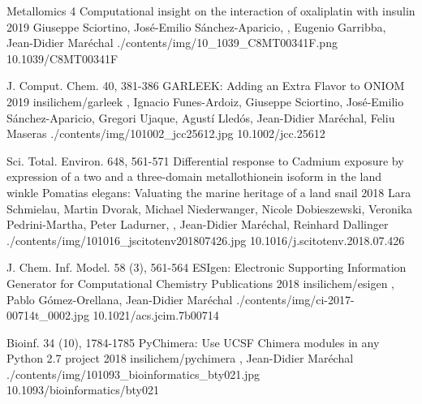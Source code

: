 \begin{cventries}
  \pubentry
    {Metallomics 4} %
    {Computational insight on the interaction of oxaliplatin with insulin} %
    {2019} %
    {} %
    {Giuseppe Sciortino, José-Emilio Sánchez-Aparicio, , Eugenio Garribba, Jean-Didier Maréchal} %
    {./contents/img/10_1039_C8MT00341F.png} %
    {10.1039/C8MT00341F} %

  \pubentry
    {J. Comput. Chem. 40, 381-386} %
    {GARLEEK: Adding an Extra Flavor to ONIOM} %
    {2019} %
    {insilichem/garleek} %
    {, Ignacio Funes-Ardoiz, Giuseppe Sciortino, José-Emilio Sánchez-Aparicio, Gregori Ujaque, Agustí Lledós, Jean-Didier Maréchal, Feliu Maseras} %
    {./contents/img/101002_jcc25612.jpg} %
    {10.1002/jcc.25612} %

  \pubentry
    {Sci. Total. Environ. 648, 561-571} %
    {Differential response to Cadmium exposure by expression of a two and a three-domain metallothionein isoform in the land winkle Pomatias elegans: Valuating the marine heritage of a land snail} %
    {2018} %
    {} %
    {Lara Schmielau, Martin Dvorak, Michael Niederwanger, Nicole Dobieszewski, Veronika Pedrini-Martha, Peter Ladurner, , Jean-Didier Maréchal, Reinhard Dallinger} %
    {./contents/img/101016_jscitotenv201807426.jpg} %
    {10.1016/j.scitotenv.2018.07.426} %

  \pubentry
    {J. Chem. Inf. Model. 58 (3), 561-564} %
    {ESIgen: Electronic Supporting Information Generator for Computational Chemistry Publications} %
    {2018} %
    {insilichem/esigen} %
    {,\textsuperscript{\dagger} Pablo Gómez-Orellana, Jean-Didier Maréchal\textsuperscript{\dagger}} %
    {./contents/img/ci-2017-00714t_0002.jpg} %
    {10.1021/acs.jcim.7b00714} %

  \pubentry
    {Bioinf. 34 (10), 1784-1785} %
    {PyChimera: Use UCSF Chimera modules in any Python 2.7 project} %
    {2018} %
    {insilichem/pychimera} %
    {,\textsuperscript{\dagger} Jean-Didier Maréchal\textsuperscript{\dagger}} %
    {./contents/img/101093_bioinformatics_bty021.jpg} %
    {10.1093/bioinformatics/bty021} %


\end{cventries}
